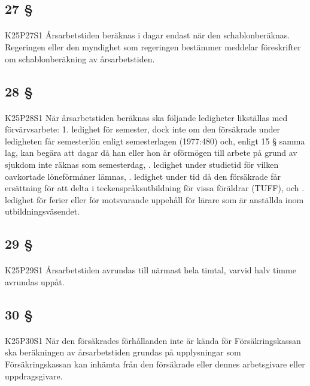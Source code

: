 \documentclass[a4paper,notitlepage,openany,10pt]{book}
\begin{document}
\subsection*{27 §}
\paragraph*{}
{\tiny K25P27S1}
Årsarbetstiden beräknas i dagar endast när den schablonberäknas. Regeringen eller den myndighet som regeringen bestämmer meddelar föreskrifter om schablonberäkning av årsarbetstiden.
\subsection*{28 §}
\paragraph*{}
{\tiny K25P28S1}
När årsarbetstiden beräknas ska följande ledigheter likställas med förvärvsarbete: 1. ledighet för semester, dock inte om den försäkrade under ledigheten får semesterlön enligt semesterlagen (1977:480) och, enligt 15 § samma lag, kan begära att dagar då han eller hon är oförmögen till arbete på grund av sjukdom inte räknas som semesterdag,
. ledighet under studietid för vilken oavkortade löneförmåner lämnas,
. ledighet under tid då den försäkrade får ersättning för att delta i teckenspråksutbildning för vissa föräldrar (TUFF), och
. ledighet för ferier eller för motsvarande uppehåll för lärare som är anställda inom utbildningsväsendet.
\subsection*{29 §}
\paragraph*{}
{\tiny K25P29S1}
Årsarbetstiden avrundas till närmast hela timtal, varvid halv timme avrundas uppåt.
\subsection*{30 §}
\paragraph*{}
{\tiny K25P30S1}
När den försäkrades förhållanden inte är kända för Försäkringskassan ska beräkningen av årsarbetstiden grundas på upplysningar som Försäkringskassan kan inhämta från den försäkrade eller dennes arbetsgivare eller uppdragsgivare.
\end{document}
